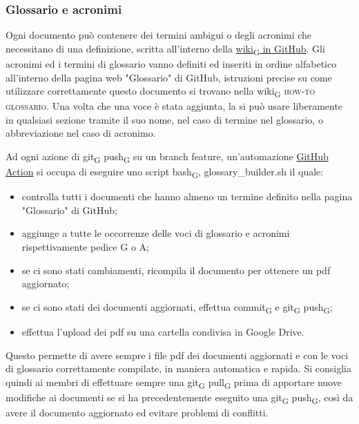     \subsubsection{Glossario e acronimi}
    Ogni documento può contenere dei termini ambigui o degli acronimi che necessitano di una definizione, scritta all'interno della \href{https://github.com/Three-Way-Milkshake/docs/wiki/Glossario}{wiki\textsubscript{G} in GitHub}.
    Gli acronimi ed i termini di glossario vanno definiti ed inseriti in ordine alfabetico all'interno della pagina web "Glossario" di GitHub, istruzioni precise su come utilizzare correttamente questo documento si trovano nella wiki\textsubscript{G} \textsc{how-to glossario}. Una volta che una voce è stata aggiunta, la si può usare liberamente in qualsiasi sezione tramite il suo nome, nel caso di termine nel glossario, o abbreviazione nel caso di acronimo.

    Ad ogni azione di git\textsubscript{G} push\textsubscript{G} su un branch feature, un'automazione \href{https://docs.github.com/en/free-pro-team@latest/actions}{GitHub Action} si occupa di eseguire uno script bash\textsubscript{G}, glossary\_builder.sh il quale:
    \begin{itemize}
        \item controlla tutti i documenti che hanno almeno un termine definito nella pagina "Glossario" di GitHub;
        \item aggiunge a tutte le occorrenze delle voci di glossario e acronimi rispettivamente pedice G o A;
        \item se ci sono stati cambiamenti, ricompila il documento per ottenere un pdf aggiornato;
        \item se ci sono stati dei documenti aggiornati, effettua commit\textsubscript{G} e git\textsubscript{G} push\textsubscript{G};
        \item effettua l'upload dei pdf su una cartella condivisa in Google Drive.
    \end{itemize}
    Questo permette di avere sempre i file pdf dei documenti aggiornati e con le voci di glossario correttamente compilate, in maniera automatica e rapida. Si consiglia quindi ai membri di effettuare sempre una git\textsubscript{G} pull\textsubscript{G} prima di apportare nuove modifiche ai documenti se si ha precedentemente eseguito una git\textsubscript{G} push\textsubscript{G}, così da avere il documento aggiornato ed evitare problemi di conflitti.
